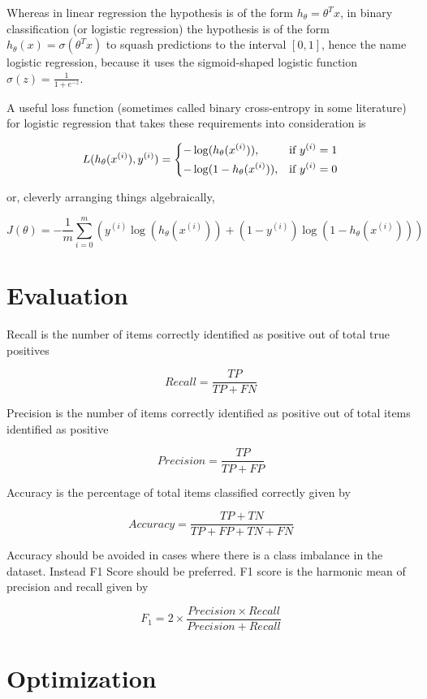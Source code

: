 Whereas in linear regression the hypothesis is of the form $h_{\theta} = \theta^Tx$, in binary classification (or logistic regression) the hypothesis is of the form $h_{\theta}(x) = \sigma(\theta^Tx)$ to squash predictions to the interval $[0, 1]$, hence the name logistic regression, because it uses the sigmoid-shaped logistic function $\sigma(z) = \frac{1}{1 + e^{-z}}$.

A useful loss function (sometimes called binary cross-entropy in some literature) for logistic regression that takes these requirements into consideration is

$$
L(h_{\theta}(x^{(i)}), y^{(i)}) =
\begin{dcases}
    -\log(h_{\theta}(x^{(i)})),& \text{if } y^{(i)} = 1\\
    -\log(1 - h_{\theta}(x^{(i)})),& \text{if } y^{(i)} = 0
\end{dcases}
$$

or, cleverly arranging things algebraically,

$$
J(\theta) = -\frac{1}{m} \sum_{i=0}^{m} ( y^{(i)}\log(h_{\theta}(x^{(i)})) + (1 - y^{(i)})\log(1 - h_{\theta}(x^{(i)})) )
$$

\section{Evaluation}

Recall is the number of items correctly identified as positive out of total true positives

$$
Recall = \frac{TP}{TP+FN}
$$

Precision is the number of items correctly identified as positive out of total items identified as positive

$$
Precision = \frac{TP}{TP+FP}
$$

Accuracy is the percentage of total items classified correctly given by

$$
Accuracy = \frac{TP+TN}{TP+FP+TN+FN}
$$

Accuracy should be avoided in cases where there is a class imbalance in the dataset. Instead F1 Score should be preferred. F1 score is the harmonic mean of precision and recall given by

$$
F_1 = 2 \times \frac{Precision \times Recall}{Precision + Recall}
$$

\section{Optimization}

